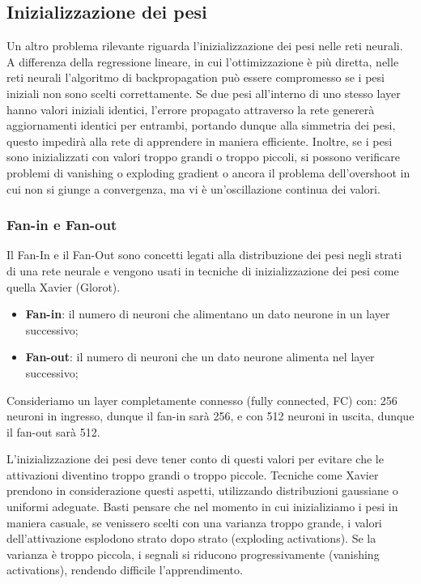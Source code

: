 \subsection{Inizializzazione dei pesi}
Un altro problema rilevante riguarda l'inizializzazione dei pesi nelle reti neurali. A differenza della regressione lineare, in cui l'ottimizzazione è più diretta, nelle reti neurali l'algoritmo di backpropagation può essere compromesso se i pesi iniziali non sono scelti correttamente. Se due pesi all'interno di uno stesso layer hanno valori iniziali identici, l'errore propagato attraverso la rete genererà aggiornamenti identici per entrambi, portando dunque alla simmetria dei pesi, questo impedirà alla rete di apprendere in maniera efficiente. Inoltre, se i pesi sono inizializzati con valori troppo grandi o troppo piccoli, si possono verificare problemi di vanishing o exploding gradient o ancora il problema dell'overshoot in cui non si giunge a convergenza, ma vi è un'oscillazione continua dei valori.

\subsubsection{Fan-in e Fan-out}
Il Fan-In e il Fan-Out sono concetti legati alla distribuzione dei pesi negli strati di una rete neurale e vengono usati in tecniche di inizializzazione dei pesi come quella Xavier (Glorot).
\begin{itemize}
    \item \textbf{Fan-in}: il numero di neuroni che alimentano un dato neurone in un layer successivo;
    \item\textbf{Fan-out}: il numero di neuroni che un dato neurone alimenta nel layer successivo;
\end{itemize}

\begin{Esempio}
    Consideriamo un layer completamente connesso (fully connected, FC) con: 256 neuroni in ingresso, dunque il fan-in sarà 256, e con 512 neuroni in uscita, dunque il fan-out sarà 512.
\end{Esempio}


L'inizializzazione dei pesi deve tener conto di questi valori per evitare che le attivazioni diventino troppo grandi o troppo piccole. Tecniche come Xavier prendono in considerazione questi aspetti, utilizzando distribuzioni gaussiane o uniformi adeguate. Basti pensare che nel momento in cui inizializiamo i pesi in maniera casuale, se venissero scelti con una varianza troppo grande, i valori dell'attivazione esplodono strato dopo strato (exploding activations). Se la varianza è troppo piccola, i segnali si riducono progressivamente (vanishing activations), rendendo difficile l'apprendimento.


